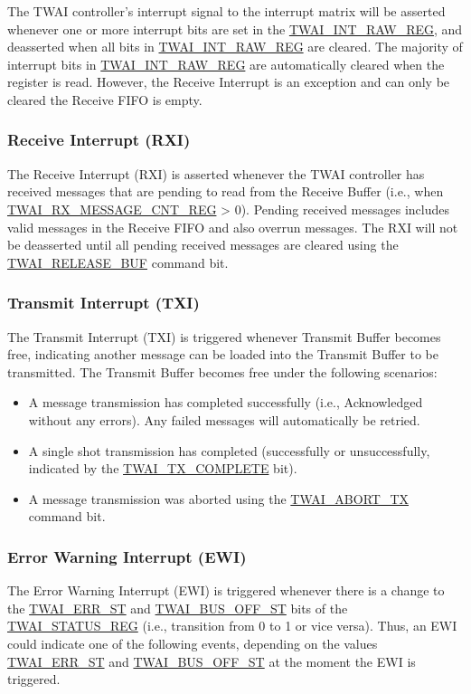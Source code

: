 \documentclass[main\_\_EN.tex]{subfiles}
\begin{document}
The TWAI controller’s interrupt signal to the interrupt matrix will be asserted whenever one or more interrupt bits are set in the \hyperref[regdesc:TWAIINTRAWREG]{TWAI\_INT\_RAW\_REG}, and deasserted when all bits in \hyperref[regdesc:TWAIINTRAWREG]{TWAI\_INT\_RAW\_REG} are cleared. The majority of interrupt bits in \hyperref[regdesc:TWAIINTRAWREG]{TWAI\_INT\_RAW\_REG} are automatically cleared when the register is read. However, the Receive Interrupt is an exception and can only be cleared the Receive FIFO is empty.


\subsubsection{Receive Interrupt (RXI)}
The Receive Interrupt (RXI) is asserted whenever the TWAI controller has received messages that are pending to read from the Receive Buffer (i.e., when \hyperref[regdesc:TWAIRXMESSAGECNTREG]{TWAI\_RX\_MESSAGE\_CNT\_REG} > 0). Pending received messages includes valid messages in the Receive FIFO and also overrun messages. The RXI will not be deasserted until all pending received messages are cleared using the \hyperref[fielddesc:TWAIRELEASEBUF]{TWAI\_RELEASE\_BUF} command bit.


\subsubsection{Transmit Interrupt (TXI)}
The Transmit Interrupt (TXI) is triggered whenever Transmit Buffer becomes free, indicating another message can be loaded into the Transmit Buffer to be transmitted. The Transmit Buffer becomes free under the following scenarios:

\begin{itemize}
    \item A message transmission has completed successfully (i.e., Acknowledged without any errors). Any failed messages will automatically be retried.
    \item A single shot transmission has completed (successfully or unsuccessfully, indicated by the \hyperref[fielddesc:TWAITXCOMPLETE]{TWAI\_TX\_COMPLETE} bit).
    \item A message transmission was aborted using the \hyperref[fielddesc:TWAIABORTTX]{TWAI\_ABORT\_TX} command bit.
\end{itemize}

\subsubsection{Error Warning Interrupt (EWI)}
The Error Warning Interrupt (EWI) is triggered whenever there is a change to the \hyperref[fielddesc:TWAIERRST]{TWAI\_ERR\_ST} and \hyperref[fielddesc:TWAIBUSOFFST]{TWAI\_BUS\_OFF\_ST} bits of the \hyperref[regdesc:TWAISTATUSREG]{TWAI\_STATUS\_REG} (i.e., transition from 0 to 1 or vice versa). Thus, an EWI could indicate one of the following events, depending on the values \hyperref[fielddesc:TWAIERRST]{TWAI\_ERR\_ST} and \hyperref[fielddesc:TWAIBUSOFFST]{TWAI\_BUS\_OFF\_ST} at the moment the EWI is triggered.
\end{document}
